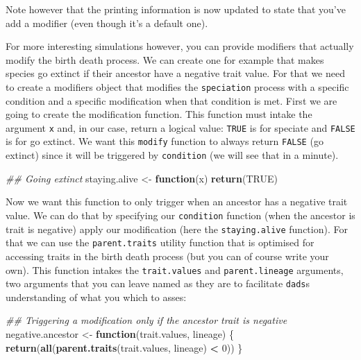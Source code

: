 \documentclass[]{book}
\newenvironment{Shaded}{\begin{snugshade}}{\end{snugshade}}
\newcommand{\CommentTok}[1]{\textcolor[rgb]{0.56,0.35,0.01}{\textit{#1}}}
\newcommand{\ControlFlowTok}[1]{\textcolor[rgb]{0.13,0.29,0.53}{\textbf{#1}}}
\newcommand{\DecValTok}[1]{\textcolor[rgb]{0.00,0.00,0.81}{#1}}
\newcommand{\KeywordTok}[1]{\textcolor[rgb]{0.13,0.29,0.53}{\textbf{#1}}}
\newcommand{\NormalTok}[1]{#1}
\newcommand{\OperatorTok}[1]{\textcolor[rgb]{0.81,0.36,0.00}{\textbf{#1}}}
\newcommand{\OtherTok}[1]{\textcolor[rgb]{0.56,0.35,0.01}{#1}}
\newcommand{\StringTok}[1]{\textcolor[rgb]{0.31,0.60,0.02}{#1}}
\begin{document}
Note however that the printing information is now updated to state that you've add a modifier (even though it's a default one).

For more interesting simulations however, you can provide modifiers that actually modify the birth death process.
We can create one for example that makes species go extinct if their ancestor have a negative trait value.
For that we need to create a modifiers object that modifies the \texttt{speciation} process with a specific condition and a specific modification when that condition is met.
First we are going to create the modification function.
This function must intake the argument \texttt{x} and, in our case, return a logical value: \texttt{TRUE} is for speciate and \texttt{FALSE} is for go extinct.
We want this \texttt{modify} function to always return \texttt{FALSE} (go extinct) since it will be triggered by \texttt{condition} (we will see that in a minute).

\begin{Shaded}
\begin{Highlighting}[]
\CommentTok{## Going extinct}
\NormalTok{staying.alive <-}\StringTok{ }\ControlFlowTok{function}\NormalTok{(x) }\KeywordTok{return}\NormalTok{(}\OtherTok{TRUE}\NormalTok{)}
\end{Highlighting}
\end{Shaded}

Now we want this function to only trigger when an ancestor has a negative trait value.
We can do that by specifying our \texttt{condition} function (when the ancestor is trait is negative) apply our modification (here the \texttt{staying.alive} function).
For that we can use the \texttt{parent.traits} utility function that is optimised for accessing traits in the birth death process (but you can of course write your own).
This function intakes the \texttt{trait.values} and \texttt{parent.lineage} arguments, two arguments that you can leave named as they are to facilitate \texttt{dads}s understanding of what you which to asses:

\begin{Shaded}
\begin{Highlighting}[]
\CommentTok{## Triggering a modification only if the ancestor trait is negative}
\NormalTok{negative.ancestor <-}\StringTok{ }\ControlFlowTok{function}\NormalTok{(trait.values, lineage) \{}
    \KeywordTok{return}\NormalTok{(}\KeywordTok{all}\NormalTok{(}\KeywordTok{parent.traits}\NormalTok{(trait.values, lineage) }\OperatorTok{<}\StringTok{ }\DecValTok{0}\NormalTok{))}
\NormalTok{\}}
\end{Highlighting}
\end{Shaded}
\end{document}
